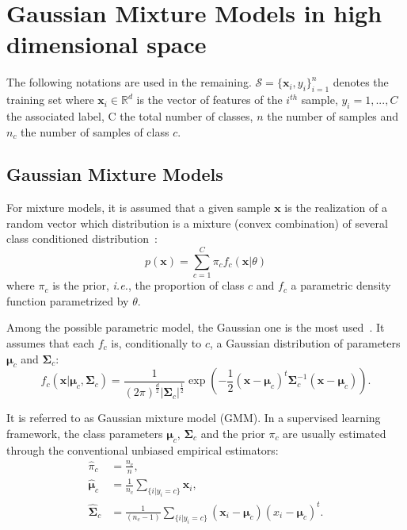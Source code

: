 \documentclass[journal,peerreview,onecolumn]{IEEEtran}
\begin{document}
\section{Gaussian Mixture Models in high dimensional space}
\label{sec:gmm-hd}

The    following    notations    are   used    in    the    remaining.
$\mathcal{S}  = \{\mathbf{x}_i,y_i\}_{i=1}^{n}$  denotes the  training
set where $\mathbf{x}_i \in \mathbb{R}^d$ is the vector of features of
the $i^{th}$ sample, $y_i = 1,...,C$ the associated label, C the total
number of classes,  $n$ the number of samples and  $n_c$ the number of
samples of class $c$.

    \subsection{Gaussian Mixture Models}

    For mixture models, it is assumed  that a given sample $\mathbf{x}$ is
    the realization  of a  random vector which  distribution is  a mixture
    (convex     combination)     of      several     class     conditioned
    distribution~\cite{Fraley00model-basedclustering}:
    \begin{equation}
        p(\mathbf{x}) = \sum_{c=1}^{C} \pi_c f_c(\mathbf{x}|\theta)
    \end{equation}
    where $\pi_c$ is  the prior, \emph{i.e.}, the  proportion of class
    $c$  and  $f_c$  a  parametric density  function  parametrized  by
    $\theta$.

    Among the possible parametric model,  the Gaussian one is the most
    used~\cite{bouveyron2014model}.   It assumes  that each  $f_c$ is,
    conditionally  to  $c$,  a  Gaussian  distribution  of  parameters
    $\boldsymbol{\mu}_c$    and    $\boldsymbol{\Sigma}_c$:
    \begin{equation*}
        f_c(\mathbf{x}|\boldsymbol{\mu}_c, \boldsymbol{\Sigma}_c) = \frac{1}{(2\pi)^{\frac{d}{2}} |\boldsymbol{\Sigma}_c|^{\frac{1}{2}}} \exp \left( -\frac{1}{2} (\mathbf{x} - \boldsymbol{\mu}_c)^t \boldsymbol{\Sigma}_c^{-1} (\mathbf{x} - \boldsymbol{\mu}_c) \right).
    \end{equation*}

    It  is  referred  to  as  Gaussian  mixture  model  (GMM).   In  a
    supervised    learning    framework,    the    class    parameters
    $\boldsymbol{\mu}_c$,   $\boldsymbol{\Sigma}_c$   and  the   prior
    $\pi_c$ are  usually estimated  through the  conventional unbiased
    empirical estimators:
    \begin{align}
        \hat{\pi}_c &= \frac{n_c}{n},\\
        \hat{\boldsymbol{\mu}}_c &= \frac{1}{n_c} \sum_{\{i|y_i = c\}} \mathbf{x}_i ,\\
        \hat{\boldsymbol{\Sigma}}_c &= \frac{1}{(n_c - 1)} \sum_{\{i|y_i = c\}} (\mathbf{x}_i - \boldsymbol{\mu}_c) (\boldsymbol{}x_i - \boldsymbol{\mu}_c)^t.
    \end{align}
\end{document}

